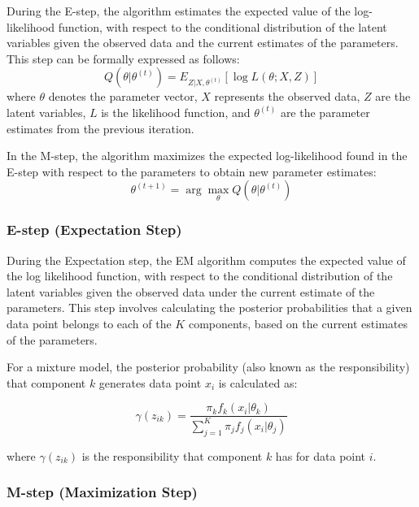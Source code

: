 \documentclass{article}
\begin{document}
During the E-step, the algorithm estimates the expected value of the log-likelihood function, with respect to the conditional distribution of the latent variables given the observed data and the current estimates of the parameters. This step can be formally expressed as follows:
\begin{equation}
Q(\theta | \theta^{(t)}) = E_{Z|X,\theta^{(t)}}[\log L(\theta; X, Z)]
\end{equation}
where \( \theta \) denotes the parameter vector, \( X \) represents the observed data, \( Z \) are the latent variables, \( L \) is the likelihood function, and \( \theta^{(t)} \) are the parameter estimates from the previous iteration.

In the M-step, the algorithm maximizes the expected log-likelihood found in the E-step with respect to the parameters to obtain new parameter estimates:
\begin{equation}
\theta^{(t+1)} = \arg \max_{\theta} Q(\theta | \theta^{(t)})
\end{equation}

\subsubsection{E-step (Expectation Step)}

During the Expectation step, the EM algorithm computes the expected value of the log likelihood function, with respect to the conditional distribution of the latent variables given the observed data under the current estimate of the parameters. This step involves calculating the posterior probabilities that a given data point belongs to each of the $K$ components, based on the current estimates of the parameters.

For a mixture model, the posterior probability (also known as the responsibility) that component $k$ generates data point $x_i$ is calculated as:

\begin{equation}
\gamma(z_{ik}) = \frac{\pi_k f_k(x_i|\theta_k)}{\sum_{j=1}^{K} \pi_j f_j(x_i|\theta_j)}
\end{equation}

where $\gamma(z_{ik})$ is the responsibility that component $k$ has for data point $i$.

\subsubsection{M-step (Maximization Step)}
\end{document}
